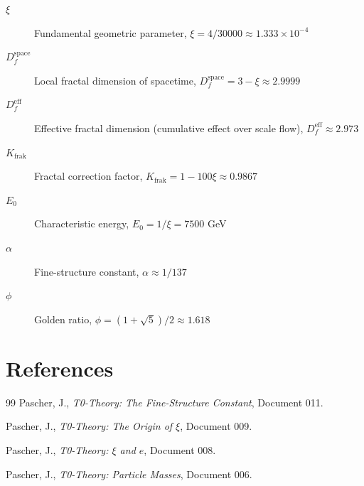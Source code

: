 	\begin{description}
		\item[$\xi$] Fundamental geometric parameter, $\xi = 4/30000 \approx 1.333 \times 10^{-4}$
		\item[$D_f^{\text{space}}$] Local fractal dimension of spacetime, $D_f^{\text{space}} = 3 - \xi \approx 2.9999$
		\item[$D_f^{\text{eff}}$] Effective fractal dimension (cumulative effect over scale flow), $D_f^{\text{eff}} \approx 2.973$
		\item[$K_{\text{frak}}$] Fractal correction factor, $K_{\text{frak}} = 1 - 100\xi \approx 0.9867$
		\item[$E_0$] Characteristic energy, $E_0 = 1/\xi = 7500$ GeV
		\item[$\alpha$] Fine-structure constant, $\alpha \approx 1/137$
		\item[$\phi$] Golden ratio, $\phi = (1+\sqrt{5})/2 \approx 1.618$
	\end{description}
	
	\section{References}
	
	\begin{thebibliography}{99}
		Pascher, J., \emph{T0-Theory: The Fine-Structure Constant}, Document 011.
		
		Pascher, J., \emph{T0-Theory: The Origin of $\xi$}, Document 009.
		
		Pascher, J., \emph{T0-Theory: $\xi$ and $e$}, Document 008.
		
		Pascher, J., \emph{T0-Theory: Particle Masses}, Document 006.
		
	\end{thebibliography}
	